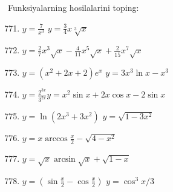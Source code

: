 	Funksiyalarning hosilalarini toping:
\begin{enumerate}\setcounter{enumi}{770}
	\item $y=\frac{7}{x^3}$ \inlineitem $y=\frac{3}{4}x\sqrt[3]{x}$
	\item $y=\frac{2}{7}x^3\sqrt{x}-\frac{4}{11}x^5\sqrt{x}+\frac{2}{15}x^7\sqrt{x}$
	\item $y=(x^2+2x+2)e^x$ \inlineitem $y=3x^3\ln x-x^3$
	\item $y=\frac{2^{3x}}{3^{2x}}$\inlineitem $y=x^2\sin x+2x\cos x-2\sin x$
	\item $y=\ln(2x^3+3x^2)$ \inlineitem $y=\sqrt{1-3x^2}$
	\item $y=x\arccos{\frac{x}{2}}-\sqrt{4-x^2}$
	\item $y=\sqrt{x}\arcsin{\sqrt{x}}+\sqrt{1-x}$
	\item $y=\left(\sin{\frac{x}{2}}-\cos{\frac{x}{2}}\right)$ \inlineitem $y=\cos^3{x/3}$
	
	
\end{enumerate}	
